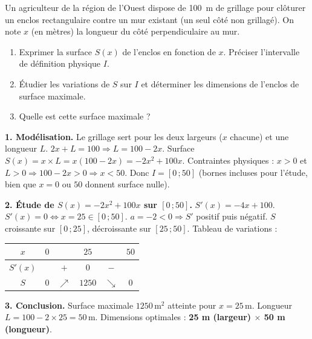 \documentclass[11pt]{article}
\begin{document}
\begin{exoresolu}
Un agriculteur de la région de l'Ouest dispose de \SI{100}{m} de grillage pour clôturer un enclos rectangulaire contre un mur existant (un seul côté non grillagé). On note $x$ (en mètres) la longueur du côté perpendiculaire au mur.
\begin{enumerate}
\item Exprimer la surface $S(x)$ de l'enclos en fonction de $x$. Préciser l'intervalle de définition physique $I$.
\item Étudier les variations de $S$ sur $I$ et déterminer les dimensions de l'enclos de surface maximale.
\item Quelle est cette surface maximale ?
\end{enumerate}
\tcblower
\textbf{1. Modélisation.}
Le grillage sert pour les deux largeurs ($x$ chacune) et une longueur $L$. $2x+L=100 \Rightarrow L=100-2x$.
Surface $S(x)=x\times L = x(100-2x) = -2x^2+100x$.
Contraintes physiques : $x>0$ et $L>0 \Rightarrow 100-2x>0 \Rightarrow x<50$.
Donc $I=[0\,;50]$ (bornes incluses pour l'étude, bien que $x=0$ ou $50$ donnent surface nulle).

\textbf{2. Étude de $S(x)=-2x^2+100x$ sur $[0\,;50]$.}
$S'(x)=-4x+100$.
$S'(x)=0 \iff x=25 \in [0\,;50]$.
$a=-2<0 \Rightarrow S'$ positif puis négatif.
$S$ croissante sur $[0\,;25]$, décroissante sur $[25\,;50]$.
Tableau de variations :
\begin{center}
\begin{tabular}{|c|ccccc|}\hline
$x$ & $0$ & & $25$ & & $50$ \\ \hline
$S'(x)$ & & $+$ & $0$ & $-$ & \\ \hline
$S$ & $0$ & $\nearrow$ & $1250$ & $\searrow$ & $0$ \\ \hline
\end{tabular}
\end{center}

\textbf{3. Conclusion.}
Surface maximale $1250\,\text{m}^2$ atteinte pour $x=25\,\text{m}$.
Longueur $L=100-2\times25=50\,\text{m}$.
Dimensions optimales : \textbf{25 m (largeur) $\times$ 50 m (longueur)}.
\end{exoresolu}
\end{document}
